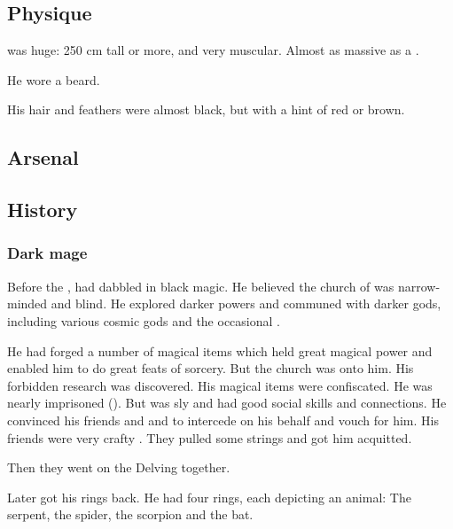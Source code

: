 \subsection{Physique}
\Zachirah{} was huge: 
250 cm tall or more, and very muscular. 
Almost as massive as a \nephil. 

He wore a beard. 

His hair and feathers were almost black, but with a hint of red or brown. 









\subsection{Arsenal}









\subsection{History}





\subsubsection{Dark mage}
Before the , \Zachirah had dabbled in black magic. 
He believed the church of \Merkyrah was narrow-minded and blind.
He explored darker powers and communed with darker gods, including various cosmic gods and the occasional \xs. 

He had forged a number of magical items which held great magical power and enabled him to do great feats of sorcery. 
But the church was onto him.
His forbidden research was discovered. 
His magical items were confiscated. 
He was nearly imprisoned (). 
But \Zachirah was sly and had good social skills and connections. 
He convinced his friends \Nathrach and \Damiarch and \Gevural to intercede on his behalf and vouch for him. 
His friends were very crafty \resphain.
They pulled some strings and got him acquitted. 

Then they went on the Delving together. 

Later \Zachirah got his rings back. 
He had four rings, each depicting an animal: 
The serpent, the spider, the scorpion and the bat. 

